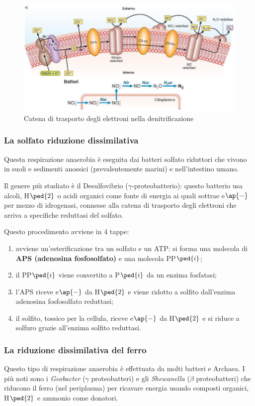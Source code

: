 \documentclass[11pt]{book}
\begin{document}
\begin{figure}[htp]
\centering
\includegraphics[scale=0.5]{img/Denitrificazione.png}
\caption{Catena di trasporto degli elettroni nella denitrificazione}
\label{}
\end{figure}

\subsubsection{La solfato riduzione dissimilativa}
Questa respirazione anaerobia è eseguita dai batteri solfato riduttori che vivono in suoli e sedimenti anossici (prevalentemente marini) e nell'intestino umano. 

Il genere più studiato è il Desulfovibrio ($\gamma$-proteobatterio): questo batterio usa alcoli, H$\ped{2}$ o acidi organici come fonte di energia ai quali sottrae e$\ap{-}$ per mezzo di idrogenasi, connesse alla catena di trasporto degli elettroni che arriva a specifiche reduttasi del solfato.

Questo procedimento avviene in 4 tappe:
\begin{enumerate}
\item avviene un'esterificazione tra un solfato e un ATP: si forma una molecola di \textbf{APS (adenosina fosfosolfato)} e una molecola PP$\ped{i}$; 
\item il PP$\ped{i}$ viene convertito a P$\ped{i}$ da un enzima fosfatasi;
\item l'APS riceve e$\ap{-}$ da H$\ped{2}$ e viene ridotto a solfito dall'enzima adenosina fosfosolfato reduttasi; 
\item il solfito, tossico per la cellula, riceve e$\ap{-}$ da H$\ped{2}$ e si riduce a solfuro grazie all'enzima solfito reduttasi.
\end{enumerate}

\subsubsection{La riduzione dissimilativa del ferro} 
Questo tipo di respirazione anaerobia è effettuata da molti batteri e Archaea. I più noti sono i \emph{Geobacter} ($\gamma$ proteobatteri) e gli \emph{Shewanella} ($\beta$ proteobatteri) che riducono il ferro (nel periplasma) per ricavare energia usando composti organici, H$\ped{2}$ e ammonio come donatori.
\end{document}
